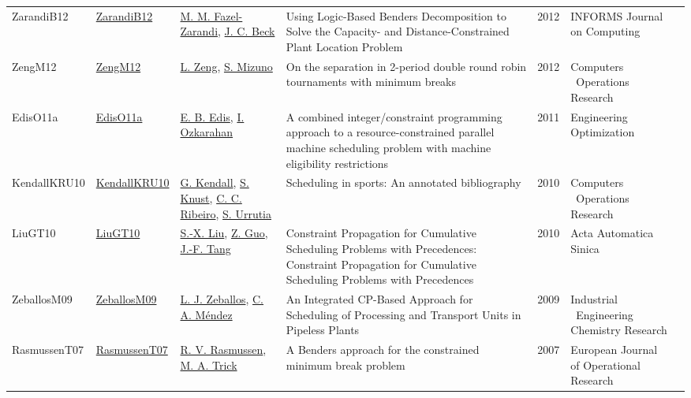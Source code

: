 {\begin{longtable}{p{2cm}p{2cm}p{5cm}p{10cm}rp{3cm}l}
ZarandiB12 & \href{http://dx.doi.org/10.1287/ijoc.1110.0458}{ZarandiB12} & \hyperref[auth:a946]{M. M. Fazel-Zarandi}, \hyperref[auth:a89]{J. C. Beck} & Using Logic-Based Benders Decomposition to Solve the Capacity- and Distance-Constrained Plant Location Problem & 2012 & \cellcolor{red!20}INFORMS Journal on Computing & \cite{ZarandiB12}\\
ZengM12 & \href{http://dx.doi.org/10.1016/j.cor.2011.10.004}{ZengM12} & \hyperref[auth:a1405]{L. Zeng}, \hyperref[auth:a1406]{S. Mizuno} & On the separation in 2-period double round robin tournaments with minimum breaks & 2012 & Computers \  Operations Research & \cite{ZengM12}\\
EdisO11a & \href{http://dx.doi.org/10.1080/03052151003759117}{EdisO11a} & \hyperref[auth:a346]{E. B. Edis}, \hyperref[auth:a348]{I. Ozkarahan} & A combined integer/constraint programming approach to a resource-constrained parallel machine scheduling problem with machine eligibility restrictions & 2011 & \cellcolor{red!20}Engineering Optimization & \cite{EdisO11a}\\
KendallKRU10 & \href{http://dx.doi.org/10.1016/j.cor.2009.05.013}{KendallKRU10} & \hyperref[auth:a1388]{G. Kendall}, \hyperref[auth:a1167]{S. Knust}, \hyperref[auth:a1387]{C. C. Ribeiro}, \hyperref[auth:a1389]{S. Urrutia} & Scheduling in sports: An annotated bibliography & 2010 & Computers \  Operations Research & \cite{KendallKRU10}\\
LiuGT10 & \href{http://dx.doi.org/10.3724/sp.j.1004.2010.00603}{LiuGT10} & \hyperref[auth:a1221]{S.-X. Liu}, \hyperref[auth:a1222]{Z. Guo}, \hyperref[auth:a1223]{J.-F. Tang} & Constraint Propagation for Cumulative Scheduling Problems with Precedences: Constraint Propagation for Cumulative Scheduling Problems with Precedences & 2010 & Acta Automatica Sinica & \cite{LiuGT10}\\
ZeballosM09 & \href{http://dx.doi.org/10.1021/ie901176n}{ZeballosM09} & \hyperref[auth:a621]{L. J. Zeballos}, \hyperref[auth:a1191]{C. A. Méndez} & \cellcolor{green!10}An Integrated CP-Based Approach for Scheduling of Processing and Transport Units in Pipeless Plants & 2009 & Industrial \  Engineering Chemistry Research & \cite{ZeballosM09}\\
RasmussenT07 & \href{http://dx.doi.org/10.1016/j.ejor.2005.10.063}{RasmussenT07} & \hyperref[auth:a1404]{R. V. Rasmussen}, \hyperref[auth:a1390]{M. A. Trick} & A Benders approach for the constrained minimum break problem & 2007 & European Journal of Operational Research & \cite{RasmussenT07}\\

\end{longtable}}
